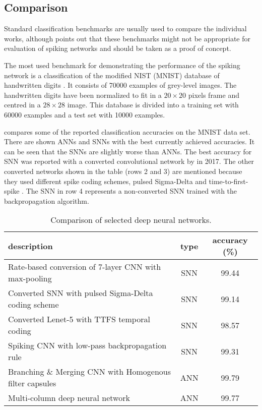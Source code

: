 \subsection{Comparison}
Standard classification benchmarks are usually used to compare the individual works, although \cite{pfeifferDeepLearningSpiking2018} points out that these benchmarks might not be appropriate for evaluation of spiking networks and should be taken as a proof of concept. \par
The most used benchmark for demonstrating the performance of the spiking network is a classification of the modified NIST (MNIST) database of handwritten digits \cite{lecunGradientbasedLearning98}. It consists of 70000 examples of grey-level images. The handwritten digits have been normalized to fit in a $20 \times 20$ pixels frame and centred in a $28 \times 28$ image. This database is divided into a training set with 60000 examples and a test set with 10000 examples. \par
{} compares some of the reported classification accuracies on the MNIST data set. There are shown ANNs and SNNs with the best currently achieved accuracies. It can be seen that the SNNs are slightly worse than ANNs. The best accuracy for SNN was reported with a converted convolutional network by \cite{rueckauerConversionContinuousValuedDeep2017} in 2017. The other converted networks shown in the table (rows 2 and 3) are mentioned because they used different spike coding schemes, pulsed Sigma-Delta \cite{zambranoFastEfficientAsynchronous2016} and time-to-first-spike \cite{vonkugelgenArtificialSpiking17}. The SNN in row 4 represents a non-converted SNN trained with the backpropagation algorithm.

\begin{table}[htb]
    \centering
    \begin{tabularx}{\linewidth}{>{\raggedright\arraybackslash}Xcc}
    \toprule
        description & type & accuracy (\%) \\
        \midrule
        Rate-based conversion of 7-layer CNN with max-pooling \cite{rueckauerConversionContinuousValuedDeep2017} & SNN & 99.44 \\
        Converted SNN with pulsed Sigma-Delta coding scheme \cite{zambranoFastEfficientAsynchronous2016} & SNN & 99.14 \\
        Converted Lenet-5 with TTFS temporal coding \cite{rueckauerConversionAnalogSpiking2018} & SNN & 98.57 \\
        Spiking CNN with low-pass backpropagation rule \cite{leeTrainingDeepSpiking2016} & SNN & 99.31 \\
        Branching \& Merging CNN with Homogenous filter capsules \cite{kalganovaBranchingMerging20} & ANN & 99.79 \\
        Multi-column deep neural network \cite{cireganMulticolumnDeep12} & ANN & 99.77 \\
        \bottomrule
    \end{tabularx}
    \caption{Comparison of selected deep neural networks.}
    \label{tab:MNIST_benchmark}
\end{table}